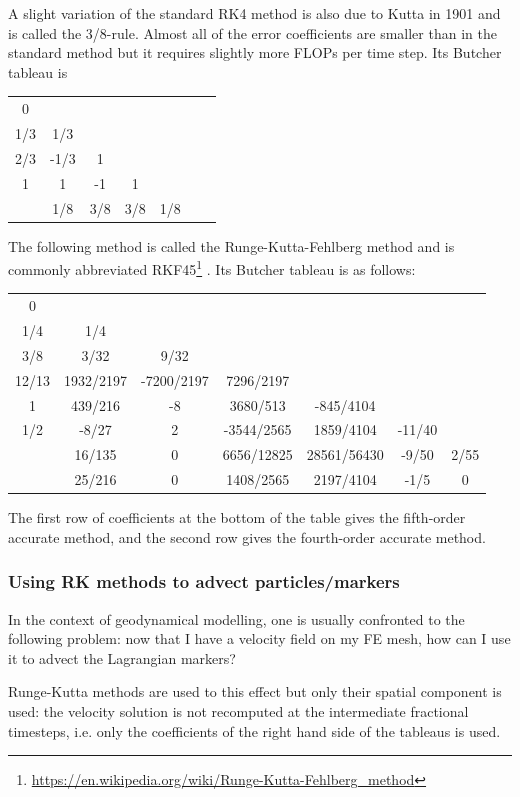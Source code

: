 A slight variation of the standard RK4 method is also due to Kutta in 1901 and is called the 3/8-rule. 
Almost all of the error coefficients are smaller than in the standard method but it requires slightly more FLOPs 
per time step. Its Butcher tableau is

\begin{tabular}{c|cccccc}
0 & \\
1/3 & 1/3 \\
2/3 & -1/3 & 1 \\
1 & 1 & -1 & 1 \\
\hline
 & 1/8 & 3/8 & 3/8 & 1/8 
\end{tabular}


 
The following method is called the Runge-Kutta-Fehlberg method and is 
commonly abbreviated 
RKF45\footnote{\url{https://en.wikipedia.org/wiki/Runge-Kutta-Fehlberg_method}}
. Its Butcher tableau is as follows: 

\begin{tabular}{c|cccccc}
0 & \\
1/4 	&1/4\\ 
3/8 	&3/32 		&9/32 \\
12/13 	&1932/2197 	&-7200/2197 &	7296/2197\\
1 	&439/216 	&-8 	&3680/513 &	-845/4104\\
1/2 	&-8/27 		&2 	&-3544/2565& 	1859/4104 &	-11/40 	\\
\hline
&16/135 	&0 		&6656/12825 	&28561/56430 	&-9/50& 	2/55\\
&25/216 	&0 	&1408/2565 	&2197/4104 	&-1/5 	&0 
\end{tabular}


The first row of coefficients at the bottom of the table gives the fifth-order accurate method, and the second row gives the fourth-order accurate method. 

\subsubsection{Using RK methods to advect particles/markers \label{sec:rkparticles}}

In the context of geodynamical modelling, one is usually confronted to the following problem:
now that I have a velocity field on my FE mesh, how can I use it to advect the Lagrangian 
markers?

Runge-Kutta methods are used to this effect but only their spatial component is used:
the velocity solution is not recomputed at the intermediate fractional timesteps, i.e. 
only the coefficients of the right hand side of the tableaus is used.

